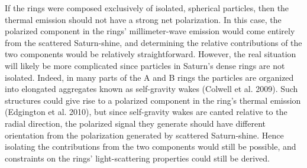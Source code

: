 \documentclass[a4paper,12pt]{article}
\begin{document}
If the rings were composed exclusively of isolated, spherical
particles, then the thermal emission should not have a strong net
polarization. In this case, the polarized component in the rings'
millimeter-wave emission would come entirely from the scattered
Saturn-shine, and determining the relative contributions of the two
components would be relatively straightforward. However, the real
situation will likely be more complicated since particles in Saturn's
dense rings are not isolated. Indeed, in many parts of the A and B
rings the particles are organized into elongated aggregates known as
self-gravity wakes (Colwell et al. 2009). Such structures could give
rise to a polarized component in the ring's thermal emission
(Edgington et al. 2010), but since self-gravity wakes are canted
relative to the radial direction, the polarized signal they generate
should have different orientation from the polarization generated by
scattered Saturn-shine. Hence isolating the contributions from the two
components would still be possible, and constraints on the rings'
light-scattering properties could still be derived. 
\end{document}
